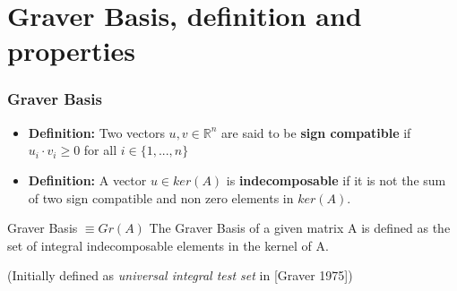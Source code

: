 \documentclass{beamer}
\begin{document}
    \section{Graver Basis, definition and properties}
    \begin{frame}
        \frametitle{Graver Basis}
        \begin{itemize}
            \item \textbf{Definition:} Two vectors $u,v \in \mathbb{R}^n$ are said to be \textbf{sign compatible} if $u_i \cdot v_i \geq 0$ for all $i \in \{1,...,n\}$
            \vspace{0.2cm}
            \item \textbf{Definition:} A vector $u \in ker(A)$ is \textbf{indecomposable} if it is not the sum of two sign compatible and non zero elements in $ker(A)$.
        \end{itemize}
        
        \pause
        \vspace{1cm}
        \begin{block}{Graver Basis $\equiv Gr(A)$ }
            The Graver Basis of a given matrix A is defined as the set of integral indecomposable elements in the kernel of A.
        \end{block}
        (Initially defined as \textit{universal integral test set} in [Graver 1975])
    \end{frame}
    
\end{document}
